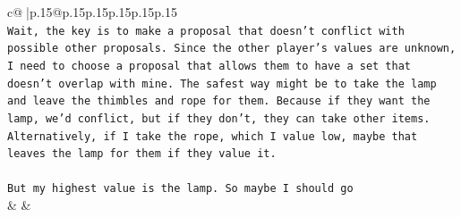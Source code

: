 \documentclass{article}
\begin{document}
{\begin{supertabular}{c@{$\;$}|p{.15\linewidth}@{}p{.15\linewidth}p{.15\linewidth}p{.15\linewidth}p{.15\linewidth}p{.15\linewidth}}
{{{\\ 
\texttt{Wait, the key is to make a proposal that doesn't conflict with possible other proposals. Since the other player's values are unknown, I need to choose a proposal that allows them to have a set that doesn't overlap with mine. The safest way might be to take the lamp and leave the thimbles and rope for them. Because if they want the lamp, we'd conflict, but if they don't, they can take other items. Alternatively, if I take the rope, which I value low, maybe that leaves the lamp for them if they value it.} \\
\\ 
\texttt{But my highest value is the lamp. So maybe I should go} \\
            }
        }
    }
    & & \\ \\


\end{supertabular}}
\end{document}
